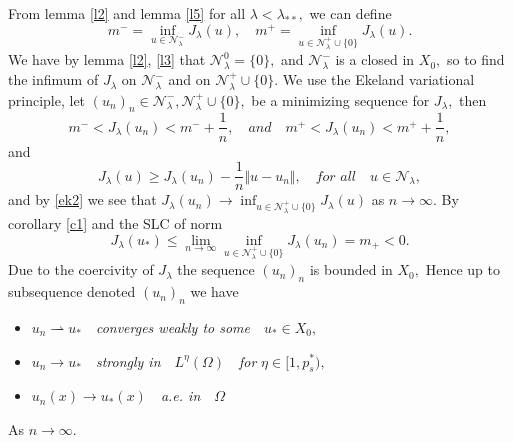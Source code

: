 \documentclass[10pt,twoside,reqno,centertags,draft]{amsart}
\begin{document}
\begin{corollary}\label{ccr}
From lemma \ref{l2} and lemma \ref{l5} for all $ \lambda < \lambda_{**},$ we can define
\begin{equation*}
m^{-} =\inf_{u \in \mathcal{N}_{\lambda}^{-}} J_{\lambda}(u), \quad m^{+} =\inf_{u \in \mathcal{N}_{\lambda}^{+} \cup \{0\}} J_{\lambda}(u). 
\end{equation*} 
We have by lemma \ref{l2}, \ref{l3} that $ \mathcal{N}_{\lambda}^{0} = \{ 0\},$ and $ \mathcal{N}_{\lambda}^{-}$ is a closed in $ X_0,$ so to find the infimum of 
$ J_{\lambda}$ on $ \mathcal{N}_{\lambda}^{-}$ and on $ \mathcal{N}_{\lambda}^{+} \cup \{ 0\}.$ We use the Ekeland variational principle, let $ (u_n)_n \in \mathcal{N}_{\lambda}^{-}, \mathcal{N}_{\lambda}^{+} \cup \{ 0\},$ be a minimizing sequence for $ J_{\lambda},$ then
\begin{equation}\label{ek1}
m^{-} < J_{\lambda}(u_n) < m^{-} + \frac{1}{n},\quad \textit{and} \quad  m^{+} < J_{\lambda}(u_n) < m^{+} + \frac{1}{n},
\end{equation}
and
\begin{equation}\label{ek2}
J_{\lambda}(u) \geq J_{\lambda}(u_n) -\frac{1}{n} \Vert u -u_n \Vert, \quad \textit{for all} \quad u \in \mathcal{N}_{\lambda},
\end{equation}
and by \ref{ek2} we see that $ J_{\lambda}(u_n) \longrightarrow \inf_{u \in \mathcal{N}_{\lambda}^{+} \cup \{0\}} J_{\lambda}(u)$ as $ n \to \infty.$  
By corollary \ref{c1} and the SLC of norm
\begin{equation}\label{slc}
J_{\lambda}(u_*) \leq \lim_{n \to \infty} \inf_{u \in \mathcal{N}_{\lambda}^{+} \cup \{0\}}J_{\lambda}(u_n) =m_+ < 0.
\end{equation}
Due to the coercivity of $ J_{\lambda}$ the sequence $ (u_n)_n$ is bounded in $ X_0,$ Hence up to subsequence denoted $ (u_n)_n$ we have
\begin{itemize}\label{v02}
\item  $ u_n \rightharpoonup u_*$ \,\, \textit{converges weakly to some} \,\, $ u_* \in X_0,$
\item  $ u_n \longrightarrow u_*$ \,\, \textit{ strongly in} \,\, $ L^{\eta}(\Omega)$ \,\, \textit{for}\,\,$ \eta \in [1, p_s^*),$
\item  $ u_n(x) \longrightarrow u_*(x)$ \,\, \textit{a.e. in} \,\, $ \Omega$
\end{itemize}
As $ n \to \infty.$
\end{corollary}
\end{document}
